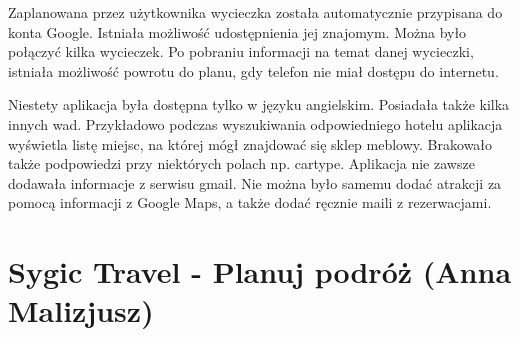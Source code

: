 \documentclass[10pt,twoside,a4paper]{report}
\begin{document}
\par Zaplanowana przez użytkownika wycieczka została automatycznie przypisana do konta Google. Istniała możliwość udostępnienia jej znajomym. Można było połączyć kilka wycieczek. Po pobraniu informacji na temat danej wycieczki, istniała możliwość powrotu do planu, gdy telefon nie miał dostępu do internetu.
\par Niestety aplikacja była dostępna tylko w języku angielskim. Posiadała także kilka innych wad. Przykładowo podczas wyszukiwania odpowiedniego hotelu aplikacja wyświetla listę miejsc, na której mógł znajdować się sklep meblowy. Brakowało także podpowiedzi przy niektórych polach np. cartype. Aplikacja nie zawsze dodawała informacje z serwisu gmail. Nie można było samemu dodać atrakcji za pomocą informacji z Google Maps, a także dodać ręcznie maili z rezerwacjami.

\section{Sygic Travel - Planuj podróż (Anna Malizjusz)}
\end{document}
